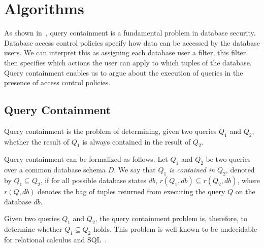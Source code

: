 \section{Algorithms}

As shown in~\cite{guarnieri2014optimal}, query containment is a fundamental problem in database security. 
%
Database access control policies specify how data can be accessed by the database users.
%
We can interpret this as assigning each database user a filter, this filter then specifies which actions the user can apply to which tuples of the database.
%
Query containment enables us to argue about the execution of queries in the presence of access control policies.
%


\subsection{Query Containment}

Query containment is the problem of determining, given two queries $Q_1$ and $Q_2$, whether the result of $Q_1$ is always contained in the result of $Q_2$. %

Query containment can be formalized as follows.
%
Let $Q_1$ and $Q_2$ be two queries over a common database schema $D$.
%
We say that \emph{$Q_1$ is contained in $Q_2$}, denoted by $Q_1 \subseteq Q_2$, if for all possible database states $\mathit{db}$, $r(Q_1,\mathit{db}) \subseteq r(Q_2, \mathit{db})$, where $r(Q, db)$ denotes the bag of tuples returned from executing the query $Q$ on the database $db$.


Given two queries $Q_1$ and $Q_2$, the query containment problem is, therefore, to determine whether $Q_1 \subseteq Q_2$ holds.
%
This problem is well-known to be undecidable for relational calculus and SQL~\cite{abiteboul1995foundations}.

